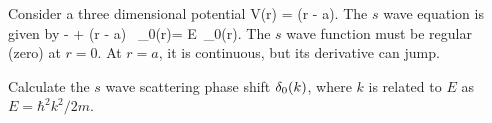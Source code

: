 \newcommand{\gam}{\gamma}
\newcommand{\chio}{\chi_0}
\newcommand{\chior}{\chio(r)}
\newcommand{\Gam}{\Gamma}
\newcommand{\drp}{\dd{r'}}
\newcommand{\En}{E_n}
\newcommand{\kn}{k_n}

\newcommand{\hql}{h_l^{(1)}\!}
\newcommand{\ks}{k^*}
\newcommand{\sigtot}{\sig_\text{tot}}

\begin{statement}{}
	Consider a three dimensional potential
	\beq
		V(r) = \frac{\hbar^2 \gam}{2m} \del(r - a).
	\eeq
	The $s$ wave {\Schrodinger} equation is given by
	\beq
		- \dv[2]{\chior}{r} + \frac{\hbar^2 \gam}{2m} \del(r - a) \, \chior = E \,\chior.
	\eeq
	The $s$ wave function must be regular (zero) at $r = 0$.  At $r = a$, it is continuous, but its derivative can jump.
\end{statement}

\begin{problem}
	Calculate the $s$ wave scattering phase shift $\delta_0(k)$, where $k$ is related to $E$ as $E = \hbar^2 k^2 / 2m$.
\end{problem}

